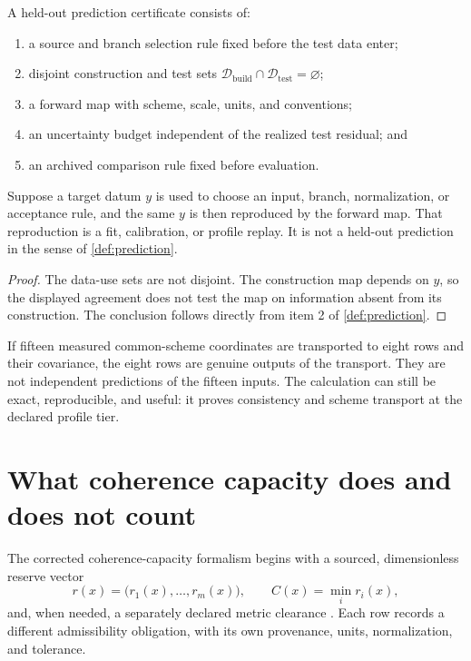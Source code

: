 \documentclass[11pt]{article}
\newcommand{\Data}{\mathcal D}
\begin{document}
\begin{definition}
\label{def:prediction}
A held-out prediction certificate consists of:
\begin{enumerate}
\item a source and branch selection rule fixed before the test data enter;
\item disjoint construction and test sets
      \(\Data_{\mathrm{build}}\cap\Data_{\mathrm{test}}=\varnothing\);
\item a forward map with scheme, scale, units, and conventions;
\item an uncertainty budget independent of the realized test residual; and
\item an archived comparison rule fixed before evaluation.
\end{enumerate}
\end{definition}

\begin{proposition}
\label{prop:replay}
Suppose a target datum \(y\) is used to choose an input, branch, normalization,
or acceptance rule, and the same \(y\) is then reproduced by the forward map.
That reproduction is a fit, calibration, or profile replay. It is not a
held-out prediction in the sense of \cref{def:prediction}.
\end{proposition}

\begin{proof}
The data-use sets are not disjoint. The construction map depends on \(y\), so
the displayed agreement does not test the map on information absent from its
construction. The conclusion follows directly from item 2 of
\cref{def:prediction}.
\end{proof}

\begin{example}
If fifteen measured common-scheme coordinates are transported to eight rows
and their covariance, the eight rows are genuine outputs of the transport.
They are not independent predictions of the fifteen inputs. The calculation
can still be exact, reproducible, and useful: it proves consistency and
scheme transport at the declared profile tier.
\end{example}

\section{What coherence capacity does and does not count}

The corrected coherence-capacity formalism begins with a sourced,
dimensionless reserve vector
\[
r(x)=\bigl(r_1(x),\ldots,r_m(x)\bigr),
\qquad
C(x)=\min_i r_i(x),
\]
and, when needed, a separately declared metric clearance
\cite{MTTCapacity2026}. Each row records a different admissibility
obligation, with its own provenance, units, normalization, and tolerance.
\end{document}
